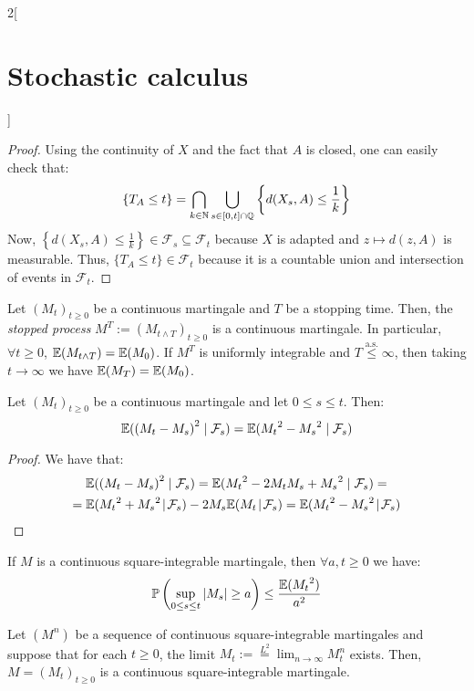 \documentclass[../../../main_math.tex]{subfiles}
\begin{document}
\begin{multicols}{2}[\section{Stochastic calculus}]
\begin{proof}
    Using the continuity of $X$ and the fact that $A$ is closed, one can easily check that:
    $$
      \{T_A \leq t\}=\bigcap_{k\in\mathbb{N}}\bigcup_{s\in[0,t]\cap\mathbb{Q}}\left\{d(X_s,A)\leq\frac{1}{k}\right\}
    $$
    Now, $\left\{d(X_s,A)\leq\frac{1}{k}\right\}\in \mathcal{F}_s\subseteq \mathcal{F}_t$ because $X$ is adapted and $z\mapsto d(z,A)$ is measurable.
    Thus, $\{T_A \leq t\}\in \mathcal{F}_t$ because it is a countable union and intersection of events in $\mathcal{F}_t$.
  \end{proof}
  \begin{theorem}\label{SC:doob_sampling}
    Let ${(M_t)}_{t\geq 0}$ be a continuous martingale and $T$ be a stopping time. Then, the \emph{stopped process} $M^T:={(M_{t\wedge T})}_{t\geq 0}$ is a continuous martingale. In particular, $\forall t\geq 0$, $\mathbb{E}(M_{t\wedge T})=\mathbb{E}(M_0)$. If $M^T$ is uniformly integrable and $T\overset{\text{a.s.}}{\leq}\infty$, then taking $t\to\infty$ we have $\mathbb{E}(M_T)=\mathbb{E}(M_0)$.
  \end{theorem}
  \begin{lemma}\label{SC:orthogonality_martingales}
    Let ${(M_t)}_{t\geq 0}$ be a continuous martingale and let $0\leq s\leq t$. Then:
    $$
      \mathbb{E}({(M_t-M_s)}^2\mid \mathcal{F}_s)=\mathbb{E}({M_t}^2-{M_s}^2\mid \mathcal{F}_s)
    $$
  \end{lemma}
  \begin{proof}
    We have that:
    \begin{multline*}
      \mathbb{E}({(M_t-M_s)}^2\mid \mathcal{F}_s) =\mathbb{E}({M_t}^2-2M_tM_s+{M_s}^2\mid \mathcal{F}_s) =\\=\mathbb{E}({M_t}^2+{M_s}^2\!\mid \!\mathcal{F}_s)-2M_s\mathbb{E}(M_t\!\mid\! \mathcal{F}_s) =\mathbb{E}({M_t}^2-{M_s}^2\!\mid\! \mathcal{F}_s)
    \end{multline*}
  \end{proof}
  \begin{theorem}\label{SC:doob_maximal}
    If $M$ is a continuous square-integrable martingale, then $\forall a,t\geq 0$ we have:
    $$
      \mathbb{P}\left(\sup_{0\leq s\leq t}\abs{M_s}\geq a\right)\leq \frac{\mathbb{E}({M_t}^2)}{a^2}
    $$
  \end{theorem}
  \begin{proposition}\label{SC:limit_of_martingales}
    Let $(M^n)$ be a sequence of continuous square-integrable martingales and suppose that for each $t\geq 0$, the limit $\displaystyle M_t:=\overset{L^2}{=}\lim_{n\to\infty}M_t^n$ exists. Then, $M={(M_t)}_{t\geq 0}$ is a continuous square-integrable martingale.

\end{proposition}
\end{multicols}
\end{document}

